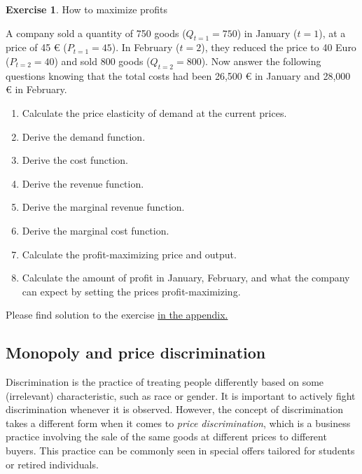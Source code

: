 \documentclass[
  12pt,
  oneside]{book}
\providecommand{\tightlist}{%
  \setlength{\itemsep}{0pt}\setlength{\parskip}{0pt}}
\theoremstyle{definition}
\theoremstyle{definition}
\theoremstyle{definition}
\newtheorem{exercise}{Exercise}[chapter]
\theoremstyle{definition}
\theoremstyle{remark}
\begin{document}
\begin{exercise}
\protect\hypertarget{exr:howtomaxprofit}{}\label{exr:howtomaxprofit}How to maximize profits

A company sold a quantity of 750 goods (\(Q_{t=1}=750\)) in January (\(t=1\)), at a price of 45 € (\(P_{t=1}=45\)). In February (\(t=2\)), they reduced the price to 40 Euro (\(P_{t=2}=40\)) and sold 800 goods (\(Q_{t=2}=800\)). Now answer the following questions knowing that the total costs had been 26,500 € in January and 28,000 € in February.

\begin{enumerate}
\def\labelenumi{\arabic{enumi}.}
\tightlist
\item
  Calculate the price elasticity of demand at the current prices.
\item
  Derive the demand function.
\item
  Derive the cost function.
\item
  Derive the revenue function.
\item
  Derive the marginal revenue function.
\item
  Derive the marginal cost function.
\item
  Calculate the profit-maximizing price and output.
\item
  Calculate the amount of profit in January, February, and what the company can expect by setting the prices profit-maximizing.
\end{enumerate}

Please find solution to the exercise \protect\hyperlink{sol:howtomaxprofit}{in the appendix.}
\end{exercise}

\hypertarget{monopoly-and-price-discrimination}{%
\subsection{Monopoly and price discrimination}\label{monopoly-and-price-discrimination}}

Discrimination is the practice of treating people differently based on some (irrelevant) characteristic, such as race or gender. It is important to actively fight discrimination whenever it is observed. However, the concept of discrimination takes a different form when it comes to \emph{price discrimination}, which is a business practice involving the sale of the same goods at different prices to different buyers. This practice can be commonly seen in special offers tailored for students or retired individuals.
\end{document}
